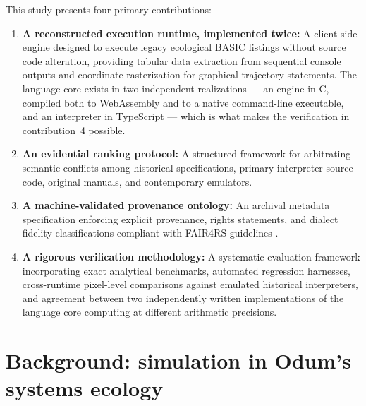 \documentclass[11pt,a4paper]{article}
\begin{document}
This study presents four primary contributions:
\begin{enumerate}
\item \textbf{A reconstructed execution runtime, implemented twice:} A client-side engine designed to execute legacy ecological BASIC listings without source code alteration, providing tabular data extraction from sequential console outputs and coordinate rasterization for graphical trajectory statements. The language core exists in two independent realizations --- an engine in C, compiled both to WebAssembly and to a native command-line executable, and an interpreter in TypeScript --- which is what makes the verification in contribution~4 possible.
\item \textbf{An evidential ranking protocol:} A structured framework for arbitrating semantic conflicts among historical specifications, primary interpreter source code, original manuals, and contemporary emulators.
\item \textbf{A machine-validated provenance ontology:} An archival metadata specification enforcing explicit provenance, rights statements, and dialect fidelity classifications compliant with FAIR4RS guidelines \citep{barker2022}.
\item \textbf{A rigorous verification methodology:} A systematic evaluation framework incorporating exact analytical benchmarks, automated regression harnesses, cross-runtime pixel-level comparisons against emulated historical interpreters, and agreement between two independently written implementations of the language core computing at different arithmetic precisions.
\end{enumerate}

\section{Background: simulation in Odum's systems ecology}
\label{sec:background}
\end{document}
